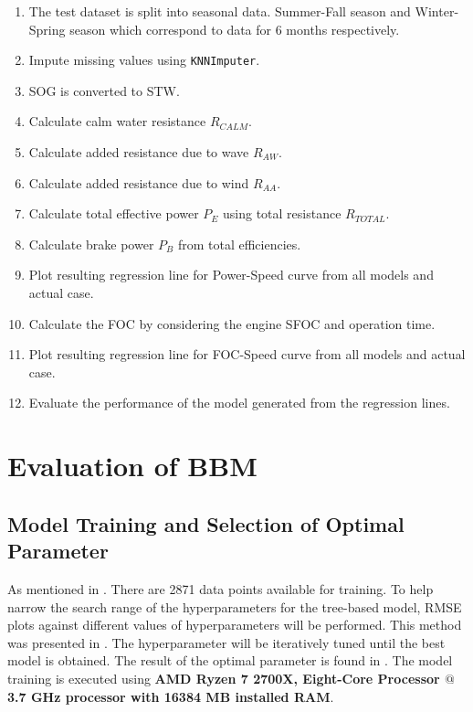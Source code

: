 \begin{enumerate}
    \setlength\itemsep{0em}
    \item The test dataset is split into seasonal data. Summer-Fall season and Winter-Spring season which correspond to data for 6 months respectively.
    \item Impute missing values using {\tt KNNImputer}.
    \item SOG is converted to STW.
    \item Calculate calm water resistance $R_{CALM}$.
    \item Calculate added resistance due to wave $R_{AW}$.
    \item Calculate added resistance due to wind $R_{AA}$.
    \item Calculate total effective power $P_E$ using total resistance $R_{TOTAL}$.
    \item Calculate brake power $P_B$ from total efficiencies.
    \item Plot resulting regression line for Power-Speed curve from all models and actual case. 
    \item Calculate the FOC by considering the engine SFOC and operation time.
    \item Plot resulting regression line for FOC-Speed curve from all models and actual case.
    \item Evaluate the performance of the model generated from the regression lines.
\end{enumerate}

\section{Evaluation of BBM}\label{sec:BBM_tree_evaluate}

\subsection{Model Training and Selection of Optimal Parameter}\label{sec:hpo_select_train}

As mentioned in . There are 2871 data points available for training. To help narrow the search range of the hyperparameters for the tree-based model, RMSE plots against different values of hyperparameters will be performed. This method was presented in . The hyperparameter will be iteratively tuned until the best model is obtained. The result of the optimal parameter is found in . The model training is executed using \textbf{AMD Ryzen 7 2700X, Eight-Core Processor $@$ 3.7 GHz processor with 16384 MB installed RAM}.\\


